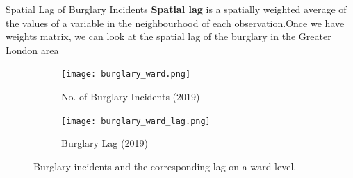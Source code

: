 \documentclass[10pt, aspectratio=169]{beamer}
\begin{document}

\begin{frame}{Spatial Lag of Burglary Incidents}
    \textbf{Spatial lag} is a spatially weighted average of the values of a
    variable in the neighbourhood of each observation.Once we have weights matrix,
    we can look at the spatial lag of the burglary in the Greater London area

    \begin{figure}
        \centering
            \begin{subfigure}[t]{0.4\textwidth}
                \texttt{[image: burglary\_ward.png]}
                \caption{No. of Burglary Incidents (2019)}\label{fig:burglary}
            \end{subfigure}
            \begin{subfigure}[t]{0.4\textwidth}
                \texttt{[image: burglary\_ward\_lag.png]}
                \caption{Burglary Lag (2019)}\label{fig:burglary_lag}
            \end{subfigure}
        \caption{Burglary incidents and the corresponding lag on a ward level.}\label{fig:lag}
    \end{figure}
\end{frame}
\end{document}
